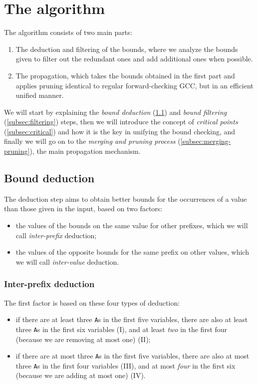 \documentclass[a4paper,10pt]{article}
\begin{document}
\section{The algorithm}
The algorithm consists of two main parts:
\begin{enumerate}
    \item The deduction and filtering of the bounds, where we analyze the bounds given to filter out the redundant ones and add additional ones when possible.
    \item The propagation, which takes the bounds obtained in the first part and applies pruning identical to regular forward-checking GCC, but in an efficient unified manner.
\end{enumerate}

We will start by explaining the \emph{bound deduction} (\ref{subsec:deduction}) and \emph{bound filtering} (\ref{subsec:filtering}) steps, then we will introduce the concept of \emph{critical points} (\ref{subsec:critical}) and how it is the key in unifying the bound checking, and finally we will go on to the \emph{merging and pruning process} (\ref{subsec:merging-pruning}), the main propagation mechanism.

\subsection{Bound deduction}
\label{subsec:deduction}

The deduction step aims to obtain better bounds for the occurrences of a value than those given in the input, based on two factors:
\begin{itemize}
    \item the values of the bounds on the same value for other prefixes, which we will call \emph{inter-prefix} deduction;
    \item the values of the opposite bounds for the same prefix on other values, which we will call \emph{inter-value} deduction.
\end{itemize}

\subsubsection{Inter-prefix deduction}

The first factor is based on these four types of deduction:
\begin{itemize}
    \item if there are at least three \texttt{A}s in the first five variables, there are also at least three \texttt{A}s in the first six variables (I), and at least \emph{two} in the first four (because we are removing at most one) (II);
    \item if there are at most three \texttt{A}s in the first five variables, there are also at most three \texttt{A}s in the first four variables (III), and at most \emph{four} in the first six (because we are adding at most one) (IV).
\end{itemize}
\end{document}
